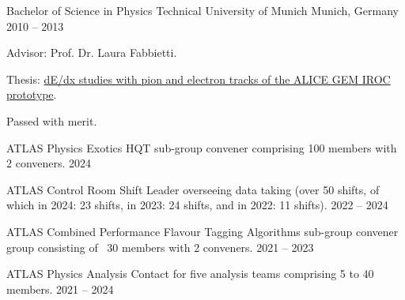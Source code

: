 \documentclass[11pt, letterpaper, draft]{academic-cv}
\begin{document}
\begin{cventries}
	\cventry
	  {Bachelor of Science in Physics} %
	  {Technical University of Munich} %
	  {Munich, Germany} %
	  {2010 -- 2013} %
	  {
		\begin{cvitems} %
		  \item {Advisor: Prof. Dr. Laura Fabbietti.}
		  \item {Thesis: \href{https://www.das.ktas.ph.tum.de/DasDocs/Public/Bachelor_Theses/thesis_Gadow.pdf}{dE/dx studies with pion and electron tracks of the ALICE GEM IROC prototype}.}
		  \item {Passed with merit.}
		\end{cvitems}
	  }
  \end{cventries}
  
\newpage




\begin{cvhonors}

  \cvhonor
    {ATLAS Physics Exotics HQT sub-group convener} %
    {comprising 100 members with 2 conveners.} %
    {} %
    {2024} %

  \cvhonor
    {ATLAS Control Room Shift Leader} %
    {overseeing data taking (over 50 shifts, of which in 2024: 23 shifts, in 2023: 24 shifts, and in 2022: 11 shifts).} %
    {} %
    {2022 -- 2024} %

  \cvhonor
    {ATLAS Combined Performance Flavour Tagging Algorithms
    sub-group convener} %
    {group consisting of ~30 members with 2 conveners.} %
    {} %
    {2021 -- 2023} %

  \cvhonor
    {ATLAS Physics Analysis Contact} %
    {for five analysis teams comprising 5 to 40 members.} %
    {} %
    {2021 -- 2024} %

\end{cvhonors}



\end{document}
